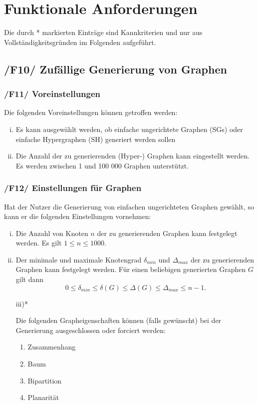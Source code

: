 \documentclass{article}
\begin{document}
	
	
	\newpage
	\section{Funktionale Anforderungen}
	Die durch * markierten Einträge sind Kannkriterien und nur aus Vollständigkeitsgründen im Folgenden aufgeführt.
	
	\subsection*{/F10/ Zufällige Generierung von Graphen} \label{f10} 
	
	\subsubsection*{/F11/ Voreinstellungen} \label{f11} 
	
	Die folgenden Voreinstellungen können getroffen werden:
	\begin{enumerate}[i)]
		\item{Es kann ausgewählt werden, ob einfache ungerichtete Graphen (SGs) oder einfache Hypergraphen (SH) generiert werden sollen}
		\item{Die Anzahl der zu generierenden (Hyper-) Graphen kann eingestellt werden. Es werden zwischen 1 und 100 000 Graphen unterstützt.}
	\end{enumerate}
	
	\subsubsection*{/F12/ Einstellungen für Graphen} \label{f12} 
	Hat der Nutzer die Generierung von einfachen ungerichteten Graphen gewählt, so kann er die folgenden Einstellungen vornehmen:
	\begin{enumerate}[i)]
		\item{Die Anzahl von Knoten $n$ der zu generierenden Graphen kann festgelegt werden. Es gilt $1 \leq n \leq 1000$.}
		\item{Der minimale und maximale Knotengrad $\delta_{min}$ und $\Delta_{max}$ der zu generierenden Graphen kann festgelegt werden. Für einen beliebigen generierten Graphen $G$ gilt dann $$0 \leq \delta_{min} \leq \delta(G) \leq \Delta(G) \leq \Delta_{max} \leq n-1.$$}
		\item[iii)*]{Die folgenden Grapheigenschaften können (falls gewünscht) bei der Generierung ausgeschlossen oder forciert werden:
			\begin{enumerate}[--]
				\item{Zusammenhang}
				\item{Baum}
				\item{Bipartition}
				\item{Planarität}
			\end{enumerate}
		}
	\end{enumerate}
	
\end{document}
